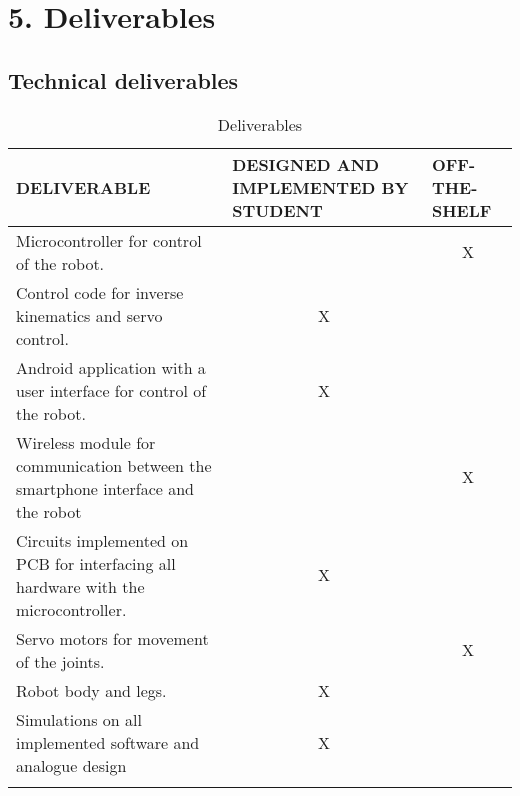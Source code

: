 
\section*{5. Deliverables}

\subsection*{Technical deliverables}

\begin{center}
\begin{longtable}{|p{7cm}|p{3.5cm}|p{3.5cm}|}
\hline
\textbf{DELIVERABLE} & \textbf{DESIGNED AND IMPLEMENTED BY STUDENT} &
\textbf{OFF-THE-SHELF} \\
\hline  Microcontroller for control of the robot.
         &     & \multicolumn{1}{c|}{X}\\
\hline Control code for inverse kinematics and servo control.
         &   \multicolumn{1}{c|}{X}  &  \\
\hline Android application with a user interface for control of the robot.
         &   \multicolumn{1}{c|}{X}  &  \\
\hline Wireless module for communication between the smartphone interface and the robot
         &     &  \multicolumn{1}{c|}{X}\\
\hline Circuits implemented on PCB for interfacing all hardware with the microcontroller.
         &  \multicolumn{1}{c|}{X}   &  \\
\hline Servo motors for movement of the joints.
	&	&\multicolumn{1}{c|}{X}	\\
	\hline Robot body and legs.
	&	\multicolumn{1}{c|}{X}&	\\
	\hline Simulations on all implemented software and analogue design
	&	\multicolumn{1}{c|}{X}&	\\
\hline
\caption{Deliverables}
\end{longtable}
\end{center}

